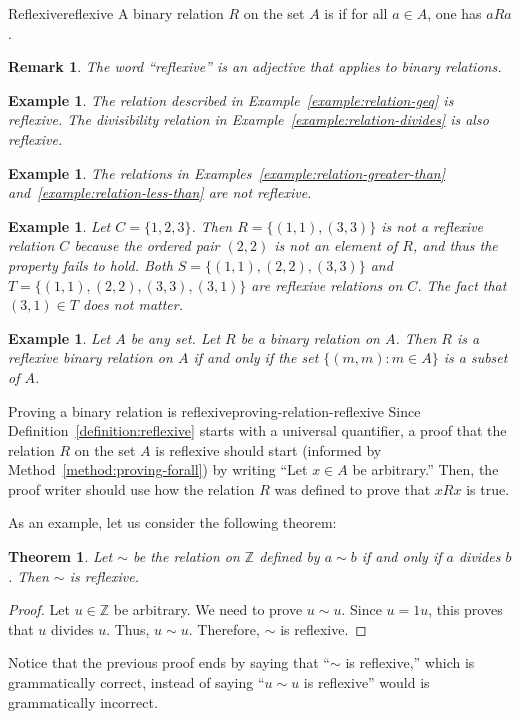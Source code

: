 \documentclass{book}
\newcounter{ekcounter}%
\theoremstyle{ekimcustom}
\newtheorem{theorem}[ekcounter]{Theorem}
\newtheorem{example}[ekcounter]{Example}
\newtheorem{remark}[ekcounter]{Remark}
\newcommand\defn[1]{{\color{blue}{\bf #1}}}
\begin{document}
\begin{bdefinition}{Reflexive}{reflexive}
A binary relation $R$ on the set $A$ is \defn{reflexive} if for all $a \in A$, one has $aRa$.
\end{bdefinition}
\begin{remark}
The word ``reflexive'' is an adjective that applies to binary relations.
\end{remark}
\begin{example}
The relation described in Example~\ref{example:relation-geq} is reflexive. The divisibility relation in Example~\ref{example:relation-divides} is also reflexive.
\end{example}
\begin{example}
The relations in Examples~\ref{example:relation-greater-than} and~\ref{example:relation-less-than} are not reflexive.
\end{example}
\begin{example}
Let $C = \{1,2,3\}$. Then $R=\{(1,1),(3,3)\}$ is not a reflexive relation $C$ because the ordered pair $(2,2)$ is not an element of $R$, and thus the property  fails to hold. Both $S=\{(1,1),(2,2),(3,3)\}$ and $T=\{(1,1),(2,2),(3,3),(3,1)\}$ are reflexive relations on $C$. The fact that $(3,1) \in T$ does not matter.
\end{example}
\begin{example}
Let $A$ be any set. Let $R$ be a binary relation on $A$. Then $R$ is a \emph{reflexive} binary relation on $A$ if and only if the set $\{(m,m) : m \in A\}$ is a subset of $A$.
\end{example}
\begin{bmethod}{Proving a binary relation is reflexive}{proving-relation-reflexive}
Since Definition~\ref{definition:reflexive} starts with a universal quantifier, a proof that the relation $R$ on the set $A$ is reflexive should start (informed by Method~\ref{method:proving-forall}) by writing ``Let $x \in A$ be arbitrary.'' Then, the proof writer should use how the relation $R$ was defined to prove that $xRx$ is true.
\end{bmethod}
As an example, let us consider the following theorem:
\begin{theorem}
Let $\sim$ be the relation on $\mathbb{Z}$ defined by $a \sim b$ if and only if $a$ divides $b$. Then $\sim$ is reflexive.
\end{theorem}
\begin{proof}
Let $u \in \mathbb{Z}$ be arbitrary. We need to prove $u \sim u$. Since $u=1u$, this proves that $u$ divides $u$. Thus, $u \sim u$. Therefore, $\sim$ is reflexive.
\end{proof}
\begin{bwarning}{}{}
Notice that the previous proof ends by saying that ``$\sim$ is reflexive,'' which is grammatically correct, instead of saying ``$u \sim u$ is reflexive'' would is grammatically incorrect.
\end{bwarning}
\end{document}
